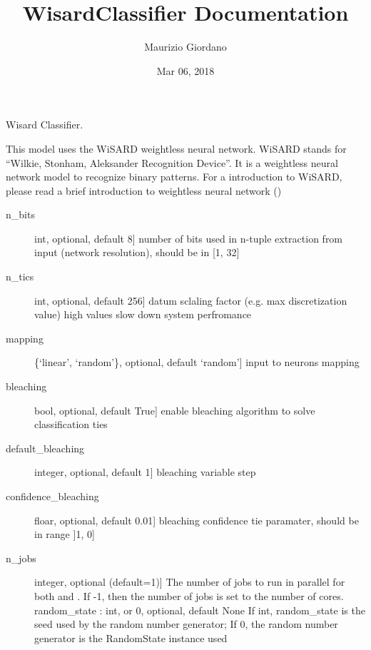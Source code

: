 \documentclass[letterpaper,10pt,english]{sphinxmanual}
\title{WisardClassifier Documentation}
\date{Mar 06, 2018}
\author{Maurizio Giordano}
\begin{document}
\maketitle
\sphinxtableofcontents
{}\label{\detokenize{index::doc}}


\begin{fulllineitems}
\label{\detokenize{index:wis.WisardClassifier}}
Wisard Classifier.

This model uses the WiSARD weightless neural network.
WiSARD stands for “Wilkie, Stonham, Aleksander Recognition Device”.
It is a weightless neural network model to recognize binary patterns.
For a introduction to WiSARD, please read a brief introduction to
weightless neural network ()
\begin{description}
\item[{n\_bits}] \leavevmode{[}int, optional, default 8{]}
number of bits used in n-tuple extraction from input (network resolution),
should be in {[}1, 32{]}

\item[{n\_tics}] \leavevmode{[}int, optional, default 256{]}
datum sclaling factor (e.g. max discretization value)
high values slow down system perfromance

\item[{mapping}] \leavevmode{[}\{‘linear’, ‘random’\}, optional, default ‘random’{]}
input to neurons mapping

\item[{bleaching}] \leavevmode{[}bool, optional, default True{]}
enable bleaching algorithm to solve classification ties

\item[{default\_bleaching}] \leavevmode{[}integer, optional, default 1{]}
bleaching variable step

\item[{confidence\_bleaching}] \leavevmode{[}floar, optional, default 0.01{]}
bleaching confidence tie paramater,
should be in range {]}1, 0{]}

\item[{n\_jobs}] \leavevmode{[}integer, optional (default=1){]}
The number of jobs to run in parallel for both  and .
If -1, then the number of jobs is set to the number of cores.
random\_state : int, or 0, optional, default None
If int, random\_state is the seed used by the random number generator;
If 0, the random number generator is the RandomState instance used


\end{description}
\end{fulllineitems}
\end{document}

